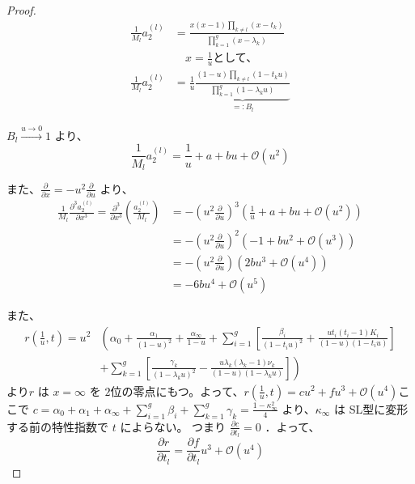 \begin{story}
\begin{proof}
\begin{align*}
\frac{1}{M_l} a_2^{(l)} &= \frac{x(x-1) \prod_{k \neq l} (x-t_k)}{\prod_{k=1}^g (x-\lambda_k)} \\
&\quad x = \frac{1}{u} \text{として、} \\
\frac{1}{M_l} a_2^{(l)} &= \frac{1}{u} \underbrace{\frac{(1-u) \prod_{k \neq l} (1-t_k u)}{\prod_{k=1}^g (1-\lambda_k u)}}_{=: B_l}
\end{align*}

$B_l \xrightarrow{u \to 0} 1$ より、
\begin{equation*}
\frac{1}{M_l} a_2^{(l)} = \frac{1}{u} + a + b u + \mathcal{O}(u^2)
\end{equation*}

また、$\frac{\partial}{\partial x} = -u^2 \frac{\partial}{\partial u}$ より、
\begin{align*}
\frac{1}{M_l} \frac{\partial^3 a_2^{(l)}}{\partial x^3} = \frac{\partial^3}{\partial x^3} \left( \frac{a_2^{(l)}}{M_l} \right) &= - \left( u^2 \frac{\partial}{\partial u} \right)^3 \left( \frac{1}{u} + a + b u + \mathcal{O}(u^2) \right) \\
&= - \left( u^2 \frac{\partial}{\partial u} \right)^2 \left( -1 + b u^2 + \mathcal{O}(u^3) \right) \\
&= - \left( u^2 \frac{\partial}{\partial u} \right) \left( 2 b u^3 + \mathcal{O}(u^4) \right) \\
&= -6 b u^4 + \mathcal{O}(u^5)
\end{align*}

また、
\begin{align*}
r\left(\frac{1}{u}, t\right) = u^2& \left( \alpha_0 + \frac{\alpha_1}{(1-u)^2} + \frac{\alpha_\infty}{1-u} + \sum_{i=1}^g \left[ \frac{\beta_i}{(1-t_i u)^2} + \frac{u t_i(t_i-1) K_i}{(1-u)(1-t_i u)} \right]\right. \\
&\left.+ \sum_{k=1}^g \left[ \frac{\gamma_k}{(1-\lambda_k u)^2} - \frac{u \lambda_k(\lambda_k-1) \nu_k}{(1-u)(1-\lambda_k u)} \right] \right) 
\end{align*}
より$r$ は $x = \infty$ を $2$位の零点にもつ。よって、$r\left(\frac{1}{u}, t\right) = c u^2 + f u^3 + \mathcal{O}(u^4)$ここで $c = \alpha_0 + \alpha_1 + \alpha_\infty + \sum_{i=1}^g \beta_i + \sum_{k=1}^g \gamma_k = \frac{1-\kappa_\infty^2}{4}$ より、$\kappa_\infty$ は SL型に変形する前の特性指数で $t$ によらない。
つまり $\frac{\partial c}{\partial t_l} = 0$ ．よって、
\begin{equation*}
\frac{\partial r}{\partial t_l} = \frac{\partial f}{\partial t_l} u^3 + \mathcal{O}(u^4)
\end{equation*}


\end{proof}
\end{story}
